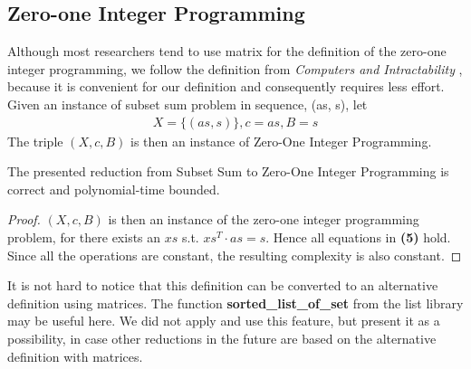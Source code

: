 \subsection{Zero-one Integer Programming}
Although most researchers tend to use matrix for the 
definition of the zero-one integer programming, we follow the definition from \textit{Computers and Intractability} \cite{garey1979computers}, because 
it is convenient for our definition and consequently requires less effort. Given an instance of subset sum problem in sequence,
(as, s), let 
\begin{align*}
    X = \{(as, s)\}, c = as, B = s
\end{align*} 
The triple $(X, c, B)$ is then an instance of Zero-One Integer Programming.
\begin{theorem}
    The presented reduction from Subset Sum to Zero-One Integer Programming is correct and polynomial-time bounded.
\end{theorem}
\begin{proof}
    $(X, c, B)$ is then an instance of the zero-one integer programming problem,
    for there exists an $xs$ s.t. $xs^T \cdot as = s$. Hence all equations in \textbf{(5)} hold.
    Since all the operations are constant, the resulting complexity is also constant.
\end{proof}
It is not hard to notice that this definition can be converted to an alternative definition using matrices. 
The function \textbf{sorted\_list\_of\_set} from the list library may be useful here. 
We did not apply and use this feature, but present it as a possibility, 
in case other reductions in the future are based on the alternative definition with matrices.
